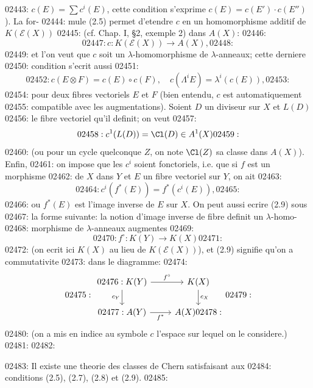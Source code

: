 02443: $c(E) = \sum c^i(E)$, cette condition s'exprime $c(E) = c(E') \cdot c(E'')$). La for-
02444: mule (2.5) permet d'etendre $c$ en un homomorphisme additif de $K(\mathcal{E}(X))$
02445: (cf. Chap. I, \S 2, exemple 2) dans $A(X)$:
02446: \begin{equation}
02447: c: K(\mathcal{E}(X)) \longrightarrow A(X),
02448: \end{equation}
02449: et l'on veut que $c$ soit un $\lambda$-homomorphisme de $\lambda$-anneaux; cette derniere
02450: condition s'ecrit aussi
02451: \begin{equation}
02452: c(E \otimes F) = c(E) \circ c(F), \quad c(\Lambda^i E) = \lambda^i(c(E)),
02453: \end{equation}
02454: pour deux fibres vectoriels $E$ et $F$ (bien entendu, $c$ est automatiquement
02455: compatible avec les augmentations). Soient $D$ un diviseur sur $X$ et $L(D)$
02456: le fibre vectoriel qu'il definit; on veut
02457: \begin{equation}
02458: c^1(L(D)) = \Cl(D) \in A^1(X)
02459: \end{equation}
02460: (ou pour un cycle quelconque $Z$, on note $\Cl(Z)$ sa classe dans $A(X)$). Enfin,
02461: on impose que les $c^i$ soient fonctoriels, i.e. que si $f$ est un morphisme
02462: de $X$ dans $Y$ et $E$ un fibre vectoriel sur $Y$, on ait
02463: \begin{equation}
02464: c^i(f^{*}(E)) = f^{*}(c^i(E)),
02465: \end{equation}
02466: ou $f^{*}(E)$ est l'image inverse de $E$ sur $X$. On peut aussi ecrire (2.9) sous
02467: la forme suivante: la notion d'image inverse de fibre definit un $\lambda$-homo-
02468: morphisme de $\lambda$-anneaux augmentes
02469: \begin{equation}
02470: f^{\circ}: K(Y) \longrightarrow K(X)
02471: \end{equation}
02472: (on ecrit ici $K(X)$ au lieu de $K(\mathcal{E}(X))$), et (2.9) signifie qu'on a commutativite
02473: dans le diagramme:
02474: \[
02475: \begin{tikzcd}
02476: K(Y) \arrow[r, "f^{\circ}"] \arrow[d, "c_Y"'] & K(X) \arrow[d, "c_X"] \\
02477: A(Y) \arrow[r, "f^{*}"'] & A(X)
02478: \end{tikzcd}
02479: \]
02480: (on a mis en indice au symbole $c$ l'espace sur lequel on le considere.)
02481: 
02482: \begin{theorem}
02483: Il existe une theorie des classes de Chern satisfaisant aux
02484: conditions (2.5), (2.7), (2.8) et (2.9).
02485: \end{theorem}
